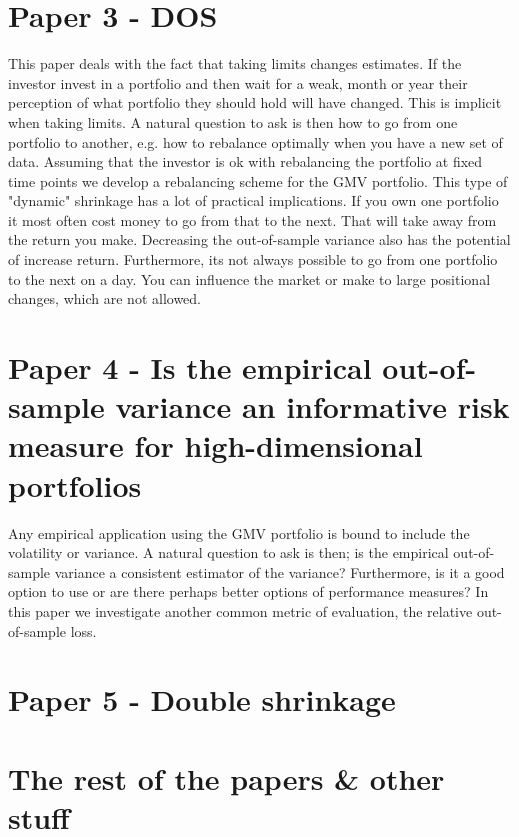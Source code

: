\documentclass[]{book}\usepackage{knitr}
\begin{document}
\section*{Paper 3 - DOS}\label{sec:paper3}
This paper deals with the fact that taking limits changes estimates. If the investor invest in a portfolio and then wait for a weak, month or year their perception of what portfolio they should hold will have changed. This is implicit when taking limits.  A natural question to ask is then how to go from one portfolio to another, e.g. how to rebalance optimally when you have a new set of data. Assuming that the investor is ok with rebalancing the portfolio at fixed time points we develop a rebalancing scheme for the GMV portfolio. This type of "dynamic" shrinkage has a lot of practical implications. If you own one portfolio it most often cost money to go from that to the next. That will take away from the return you make. Decreasing the out-of-sample variance also has the potential of increase return. Furthermore, its not always possible to go from one portfolio to the next on a day. You can influence the market or make to large positional changes, which are not allowed.

\section*{Paper 4 - Is the empirical out-of-sample variance an informative risk measure for high-dimensional portfolios}\label{sec:paper4}
Any empirical application using the GMV portfolio is bound to include the volatility or variance. A natural question to ask is then; is the empirical out-of-sample variance a consistent estimator of the variance? Furthermore, is it a good option to use or are there perhaps better options of performance measures? In this paper we investigate another common metric of evaluation, the relative out-of-sample loss.   

\section*{Paper 5 - Double shrinkage}\label{sec:paper5}


\section{The rest of the papers \& other stuff}
\end{document}

